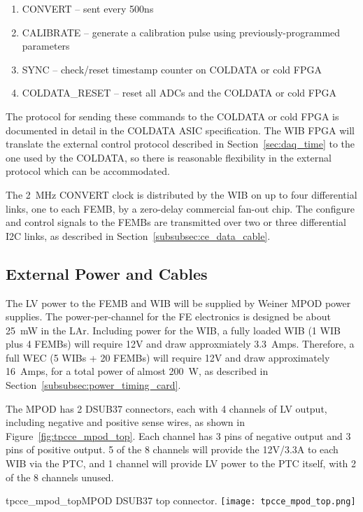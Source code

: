 \begin{enumerate}
  \item CONVERT -- sent every 500ns
  \item CALIBRATE -- generate a calibration pulse using
    previously-programmed parameters
  \item SYNC -- check/reset timestamp counter on COLDATA or cold FPGA
  \item COLDATA\_RESET -- reset all ADCs and the COLDATA or cold FPGA
\end{enumerate}

The protocol for sending these commands to the COLDATA or cold FPGA is
documented in detail in the COLDATA ASIC specification.  The WIB FPGA
will translate the external control protocol described in Section~\ref{sec:daq_time} to the one used by the
COLDATA, so there is reasonable flexibility in the external protocol
which can be accommodated.

The 2~MHz CONVERT clock is distributed by the WIB on up to four differential
links, one to each FEMB, by a zero-delay commercial fan-out chip. The
configure and control signals to the FEMBs are transmitted over two or three
differential I2C links, as described in Section~\ref{subsubsec:ce_data_cable}.

%
\subsection{External Power and Cables}
\label{subsec:ce_feedthrough_power}

The LV power to the FEMB and WIB will be supplied by Weiner MPOD power supplies. 
The power-per-channel for the FE electronics is designed be about 25~mW in the LAr.
Including power for the WIB, a fully loaded WIB (1 WIB plus 4 FEMBs) will require
12V and draw approxmiately 3.3~Amps. Therefore, a full WEC (5 WIBs + 20 FEMBs) will
require 12V and draw approximately 16~Amps, for a total power of almost 200~W, as 
described in Section~\ref{subsubsec:power_timing_card}.

The MPOD has 2 DSUB37 connectors, each with 4 channels of LV output, including negative
and positive sense wires, as shown in Figure~\ref{fig:tpcce_mpod_top}. Each channel has 3 pins
of negative output and 3 pins of positive output. 5 of the 8 channels
will provide the 12V/3.3A to each WIB via the PTC, and 1 channel will provide LV power 
to the PTC itself, with 2 of the 8 channels unused.

\begin{cdrfigure}{tpcce_mpod_top}{MPOD DSUB37 top connector.}
\texttt{[image: tpcce\_mpod\_top.png]}
\end{cdrfigure}

